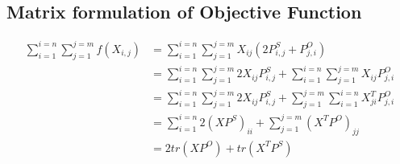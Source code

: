 \subsection{Matrix formulation of Objective Function}

\begin{align*}
\sum_{i = 1}^{i=n} \sum_{j = 1}^{j=m} f(X_{i,j}) &= \sum_{i = 1}^{i=n} \sum_{j = 1}^{j=m} X_{ij}(2P^S_{i,j} + P^O_{j,i})\\
&= \sum_{i = 1}^{i=n} \sum_{j = 1}^{j=m} 2X_{ij}P^S_{i,j} + \sum_{i = 1}^{i=n} \sum_{j = 1}^{j=m} X_{ij}P^O_{j,i} \\
&= \sum_{i = 1}^{i=n} \sum_{j = 1}^{j=m} 2X_{ij}P^S_{i,j} + \sum_{j = 1}^{j=m}\sum_{i = 1}^{i=n} X^T_{ji}P^O_{j,i} \\
&= \sum_{i = 1}^{i=n} 2(XP^S)_{ii} + \sum_{j = 1}^{j=m}(X^TP^O)_{jj}\\
&= 2tr(XP^O) + tr(X^TP^S)
\end{align*}
